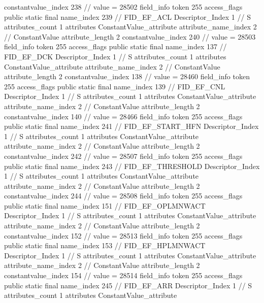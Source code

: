 {{{{{{{					constantvalue_index	238		// value = 28502
				}
				}
			}
			field_info {
				token	255
				access_flags	public static final
				name_index	239		// FID_EF_ACL
				Descriptor_Index	1		// S
				attributes_count	1
				attributes {
				ConstantValue_attribute {
					attribute_name_index	2		// ConstantValue
					attribute_length	2
					constantvalue_index	240		// value = 28503
				}
				}
			}
			field_info {
				token	255
				access_flags	public static final
				name_index	137		// FID_EF_DCK
				Descriptor_Index	1		// S
				attributes_count	1
				attributes {
				ConstantValue_attribute {
					attribute_name_index	2		// ConstantValue
					attribute_length	2
					constantvalue_index	138		// value = 28460
				}
				}
			}
			field_info {
				token	255
				access_flags	public static final
				name_index	139		// FID_EF_CNL
				Descriptor_Index	1		// S
				attributes_count	1
				attributes {
				ConstantValue_attribute {
					attribute_name_index	2		// ConstantValue
					attribute_length	2
					constantvalue_index	140		// value = 28466
				}
				}
			}
			field_info {
				token	255
				access_flags	public static final
				name_index	241		// FID_EF_START_HFN
				Descriptor_Index	1		// S
				attributes_count	1
				attributes {
				ConstantValue_attribute {
					attribute_name_index	2		// ConstantValue
					attribute_length	2
					constantvalue_index	242		// value = 28507
				}
				}
			}
			field_info {
				token	255
				access_flags	public static final
				name_index	243		// FID_EF_THRESHOLD
				Descriptor_Index	1		// S
				attributes_count	1
				attributes {
				ConstantValue_attribute {
					attribute_name_index	2		// ConstantValue
					attribute_length	2
					constantvalue_index	244		// value = 28508
				}
				}
			}
			field_info {
				token	255
				access_flags	public static final
				name_index	151		// FID_EF_OPLMNWACT
				Descriptor_Index	1		// S
				attributes_count	1
				attributes {
				ConstantValue_attribute {
					attribute_name_index	2		// ConstantValue
					attribute_length	2
					constantvalue_index	152		// value = 28513
				}
				}
			}
			field_info {
				token	255
				access_flags	public static final
				name_index	153		// FID_EF_HPLMNWACT
				Descriptor_Index	1		// S
				attributes_count	1
				attributes {
				ConstantValue_attribute {
					attribute_name_index	2		// ConstantValue
					attribute_length	2
					constantvalue_index	154		// value = 28514
				}
				}
			}
			field_info {
				token	255
				access_flags	public static final
				name_index	245		// FID_EF_ARR
				Descriptor_Index	1		// S
				attributes_count	1
				attributes {
				ConstantValue_attribute {
}}}}}}}
